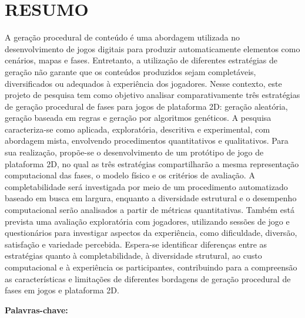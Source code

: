 \chapter*{RESUMO}

A geração procedural de conteúdo é uma abordagem utilizada no desenvolvimento 
de jogos digitais para produzir automaticamente elementos como cenários, mapas 
e fases. Entretanto, a utilização de diferentes estratégias de geração não 
garante que os conteúdos produzidos sejam completáveis, diversificados ou 
adequados à experiência dos jogadores. Nesse contexto, este projeto de pesquisa
tem como objetivo analisar comparativamente três estratégias de geração 
procedural de fases para jogos de plataforma 2D: geração aleatória, geração 
baseada em regras e geração por algoritmos genéticos. A pesquisa caracteriza-se 
como aplicada, exploratória, descritiva e experimental, com abordagem mista, 
envolvendo procedimentos quantitativos e qualitativos. Para sua realização, 
propõe-se o desenvolvimento de um protótipo de jogo de plataforma 2D, no qual 
as três estratégias compartilharão a mesma representação computacional das 
fases, o modelo físico e os critérios de avaliação. A completabilidade será 
investigada por meio de um procedimento automatizado baseado em busca em 
largura, enquanto a diversidade estrutural e o desempenho computacional serão 
analisados a partir de métricas quantitativas. Também está prevista uma 
avaliação exploratória com jogadores, utilizando sessões de jogo e 
questionários para investigar aspectos da experiência, como dificuldade, 
diversão, satisfação e variedade percebida. Espera-se identificar diferenças 
entre as estratégias quanto à completabilidade, à diversidade strutural, ao 
custo computacional e à experiência os participantes, contribuindo para a 
compreensão as características e limitações de diferentes bordagens de geração
procedural de fases em jogos e plataforma 2D.

\vspace{0.5cm}
\noindent\textbf{Palavras-chave:} \opalavraschave
\cleardoublepage

